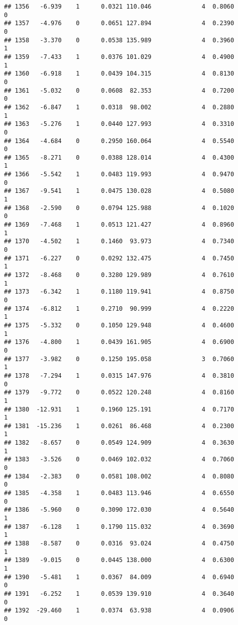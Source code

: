 \documentclass[
]{article}
\begin{document}
\begin{verbatim}
## 1356   -6.939    1      0.0321 110.046              4  0.8060      0
## 1357   -4.976    0      0.0651 127.894              4  0.2390      0
## 1358   -3.370    0      0.0538 135.989              4  0.3960      1
## 1359   -7.433    1      0.0376 101.029              4  0.4900      1
## 1360   -6.918    1      0.0439 104.315              4  0.8130      0
## 1361   -5.032    0      0.0608  82.353              4  0.7200      0
## 1362   -6.847    1      0.0318  98.002              4  0.2880      1
## 1363   -5.276    1      0.0440 127.993              4  0.3310      0
## 1364   -4.684    0      0.2950 160.064              4  0.5540      0
## 1365   -8.271    0      0.0388 128.014              4  0.4300      1
## 1366   -5.542    1      0.0483 119.993              4  0.9470      0
## 1367   -9.541    1      0.0475 130.028              4  0.5080      1
## 1368   -2.590    0      0.0794 125.988              4  0.1020      0
## 1369   -7.468    1      0.0513 121.427              4  0.8960      1
## 1370   -4.502    1      0.1460  93.973              4  0.7340      0
## 1371   -6.227    0      0.0292 132.475              4  0.7450      1
## 1372   -8.468    0      0.3280 129.989              4  0.7610      1
## 1373   -6.342    1      0.1180 119.941              4  0.8750      0
## 1374   -6.812    1      0.2710  90.999              4  0.2220      1
## 1375   -5.332    0      0.1050 129.948              4  0.4600      1
## 1376   -4.800    1      0.0439 161.905              4  0.6900      0
## 1377   -3.982    0      0.1250 195.058              3  0.7060      1
## 1378   -7.294    1      0.0315 147.976              4  0.3810      0
## 1379   -9.772    0      0.0522 120.248              4  0.8160      1
## 1380  -12.931    1      0.1960 125.191              4  0.7170      1
## 1381  -15.236    1      0.0261  86.468              4  0.2300      1
## 1382   -8.657    0      0.0549 124.909              4  0.3630      1
## 1383   -3.526    0      0.0469 102.032              4  0.7060      0
## 1384   -2.383    0      0.0581 108.002              4  0.8080      0
## 1385   -4.358    1      0.0483 113.946              4  0.6550      0
## 1386   -5.960    0      0.3090 172.030              4  0.5640      1
## 1387   -6.128    1      0.1790 115.032              4  0.3690      1
## 1388   -8.587    0      0.0316  93.024              4  0.4750      1
## 1389   -9.015    0      0.0445 138.000              4  0.6300      1
## 1390   -5.481    1      0.0367  84.009              4  0.6940      0
## 1391   -6.252    1      0.0539 139.910              4  0.3640      0
## 1392  -29.460    1      0.0374  63.938              4  0.0906      0

\end{verbatim}
\end{document}

